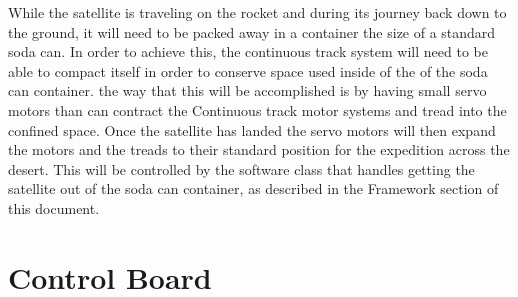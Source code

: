 \documentclass[10pt,letterpaper,onecolumn,journal]{IEEEtran}
\begin{document}
While the satellite is traveling on the rocket and during its journey back down to the ground, it will need to be packed away in a container the size of a standard soda can. In order to achieve this, the continuous track system will need to be able to compact itself in order to conserve space used inside of the of the soda can container. the way that this will be accomplished is by having small servo motors than can contract the Continuous track motor systems and tread into the confined space. Once the satellite has landed the servo motors will then expand the motors and the treads to their standard position for the expedition across the desert. This will be controlled by the software class that handles getting the satellite out of the soda can container, as described in the Framework section of this document.\vspace{.3cm}
\par


\section{Control Board}
\end{document}
